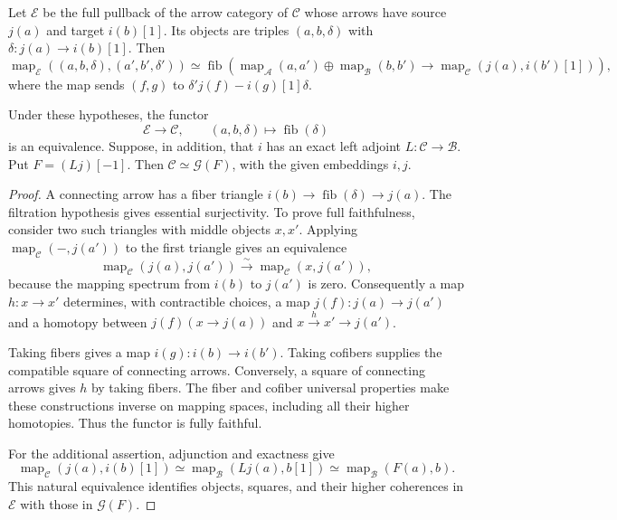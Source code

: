 Let $\mathcal E$ be the full pullback of the arrow category of
$\mathcal C$ whose arrows have source $j(a)$ and target $i(b)[1]$.
Its objects are triples $(a,b,\delta)$ with
$\delta:j(a)\to i(b)[1]$. Then
\[
 \operatorname{map}_{\mathcal E}((a,b,\delta),(a',b',\delta'))
 \simeq\operatorname{fib}\left(
 \operatorname{map}_{\mathcal A}(a,a')\oplus
 \operatorname{map}_{\mathcal B}(b,b')
 \longrightarrow\operatorname{map}_{\mathcal C}(j(a),i(b')[1])
 \right),
\]
where the map sends $(f,g)$ to $\delta'j(f)-i(g)[1]\delta$.

\begin{proposition}
\label{v4-arith:ic:eis:semiorthogonal-reconstruction}
Under these hypotheses, the functor
\[
 \mathcal E\longrightarrow\mathcal C,\qquad
 (a,b,\delta)\longmapsto\operatorname{fib}(\delta)
\]
is an equivalence. Suppose, in addition, that $i$ has an exact left
adjoint $L:\mathcal C\to\mathcal B$. Put $F=(Lj)[-1]$.
Then $\mathcal C\simeq\mathcal G(F)$, with the given embeddings $i,j$.
\end{proposition}

\begin{proof}
A connecting arrow has a fiber triangle
$i(b)\to\operatorname{fib}(\delta)\to j(a)$.
The filtration hypothesis gives essential surjectivity.
To prove full faithfulness, consider two such triangles with middle
objects $x,x'$. Applying $\operatorname{map}_{\mathcal C}(-,j(a'))$
to the first triangle gives an equivalence
\[
 \operatorname{map}_{\mathcal C}(j(a),j(a'))
       \xrightarrow{\sim}
 \operatorname{map}_{\mathcal C}(x,j(a')),
\]
because the mapping spectrum from $i(b)$ to $j(a')$ is zero.
Consequently a map $h:x\to x'$ determines, with contractible choices,
a map $j(f):j(a)\to j(a')$ and a homotopy between
$j(f)(x\to j(a))$ and $x\xrightarrow{h}x'\to j(a')$.

Taking fibers gives a map $i(g):i(b)\to i(b')$.
Taking cofibers supplies the compatible square of connecting arrows.
Conversely, a square of connecting arrows gives $h$ by taking fibers.
The fiber and cofiber universal properties make these constructions
inverse on mapping spaces, including all their higher homotopies.
Thus the functor is fully faithful.

For the additional assertion, adjunction and exactness give
\[
 \operatorname{map}_{\mathcal C}(j(a),i(b)[1])
 \simeq\operatorname{map}_{\mathcal B}(Lj(a),b[1])
 \simeq\operatorname{map}_{\mathcal B}(F(a),b).
\]
This natural equivalence identifies objects, squares, and their higher
coherences in $\mathcal E$ with those in $\mathcal G(F)$.
\end{proof}

